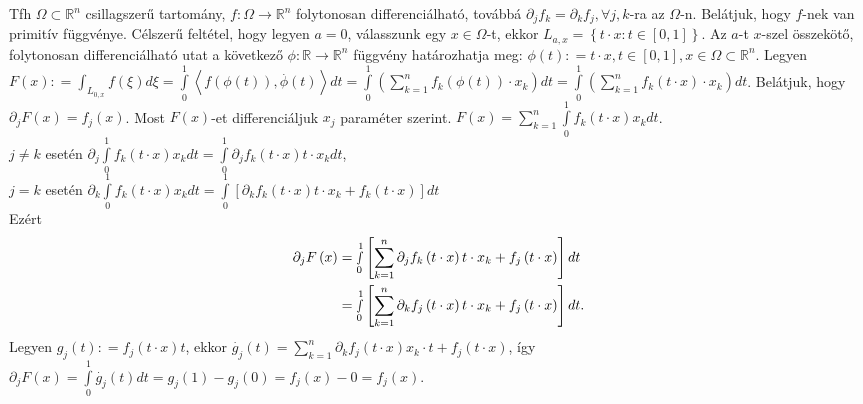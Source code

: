 \documentclass[12pt,a4paper]{scrartcl}
\begin{document}
Tfh \(\Omega \subset {\mathbb{R}}^{n}\) csillagszerű tartomány,
\(\left. f:\Omega\rightarrow{\mathbb{R}}^{n} \right.\) folytonosan
differenciálható, továbbá
\(\partial_{j}f_{k} = \partial_{k}f_{j},\forall j,k\)-ra az
\(\Omega\)-n. Belátjuk, hogy \(f\)-nek van primitív függvénye. Célszerű
feltétel, hogy legyen \(a = 0\), válasszunk egy \(x \in \Omega\)-t,
ekkor
\(L_{a,x} = \left\{ {t \cdot x:t \in \left\lbrack 0,1 \right\rbrack} \right\}\).
Az \(a\)-t \(x\)-szel összekötő, folytonosan differenciálható utat a
következő
\(\left. \phi:{\mathbb{R}}\rightarrow{\mathbb{R}}^{n} \right.\) függvény
határozhatja meg:
\(\phi\left( t \right): = t \cdot x,t \in \left\lbrack 0,1 \right\rbrack,x \in \Omega \subset {\mathbb{R}}^{n}\).
Legyen
\(F\left( x \right): = {\int_{L_{0,x}}{f\left( \xi \right)d\xi}} = {\int\limits_{0}^{1}{\left\langle {f\left( {\phi\left( t \right)} \right),\overset{.}{\phi}\left( t \right)} \right\rangle dt}} = {\int\limits_{0}^{1}{\left( {\sum\limits_{k = 1}^{n}{f_{k}\left( {\phi\left( t \right)} \right) \cdot x_{k}}} \right)dt}} = {\int\limits_{0}^{1}{\left( {\sum\limits_{k = 1}^{n}{f_{k}\left( {t \cdot x} \right) \cdot x_{k}}} \right)dt}}\).
Belátjuk, hogy
\(\partial_{j}F\left( x \right) = f_{j}\left( x \right)\). Most
\(F\left( x \right)\)-et differenciáljuk \(x_{j}\) paraméter szerint.
\(F\left( x \right) = {\sum\limits_{k = 1}^{n}{\int\limits_{0}^{1}{f_{k}\left( {t \cdot x} \right)x_{k}dt}}}\).\\
\(j \neq k\) esetén
\(\partial_{j}{\int\limits_{0}^{1}{f_{k}\left( {t \cdot x} \right)x_{k}dt}} = {\int\limits_{0}^{1}{\partial_{j}f_{k}\left( {t \cdot x} \right)t \cdot x_{k}dt}}\),\\
\(j = k\) esetén
\(\partial_{k}{\int\limits_{0}^{1}{f_{k}\left( {t \cdot x} \right)x_{k}dt}} = {\int\limits_{0}^{1}{\left\lbrack {\partial_{k}f_{k}\left( {t \cdot x} \right)t \cdot x_{k} + f_{k}\left( {t \cdot x} \right)} \right\rbrack dt}}\)\\
Ezért \[\begin{aligned}
  {\partial _j}F\left( x \right) &  = \mathop \smallint \limits_0^1 \left[ {\mathop \sum \limits_{k = 1}^n {\partial _j}{f_k}\left( {t \cdot x} \right)t \cdot {x_k} + {f_j}\left( {t \cdot x} \right)} \right]dt \\ 
   &  = \mathop \smallint \limits_0^1 \left[ {\mathop \sum \limits_{k = 1}^n {\partial _k}{f_j}\left( {t \cdot x} \right)t \cdot {x_k} + {f_j}\left( {t \cdot x} \right)} \right]dt. \\ 
\end{aligned} \] Legyen
\(g_{j}\left( t \right): = f_{j}\left( {t \cdot x} \right)t\), ekkor
\({\overset{.}{g}}_{j}\left( t \right) = {\sum\limits_{k = 1}^{n}{\partial_{k}f_{j}\left( {t \cdot x} \right)x_{k} \cdot t}} + f_{j}\left( {t \cdot x} \right)\),
így
\(\partial_{j}F\left( x \right) = {\int\limits_{0}^{1}{{\overset{.}{g}}_{j}\left( t \right)dt}} = g_{j}\left( 1 \right) - g_{j}\left( 0 \right) = f_{j}\left( x \right) - 0 = f_{j}\left( x \right)\).
\end{document}
